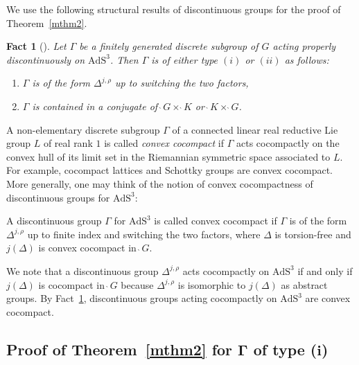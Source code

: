\documentclass[10pt,a4paper]{amsart}
\numberwithin{equation}{section}
\newtheorem{Fact}[Theorem]{Fact}
 { \theoremstyle{definition}
\newtheorem{Definition}[Theorem]{Definition}
\newtheorem{Note}[Theorem]{Note}
\newtheorem{Example}[Theorem]{Example}
\newtheorem{Remark}[Theorem]{Remark}
\newtheorem{Setting}[Theorem]{Setting}
\newtheorem{Notation}[Theorem]{Notation}
}
\begin{document}
We use the following structural results of discontinuous groups
for the proof of Theorem~\ref{mthm2}.
\begin{Fact}[{\cite[Lemma~9.2]{KaKob16}}]
\label{explicit}
Let $\Gamma$ be a finitely generated discrete subgroup of $G$
acting properly discontinuously on $\mathrm{AdS}^{3}$.
Then $\Gamma$ is of either type $(i)$ or $(ii)$ as follows:
\begin{enumerate}\itemsep=0pt
\setlength{\leftskip}{1.1cm}
\item[type\phantom{$i$}~$(i)$]
$\Gamma$ is of the form $\Delta^{j,\rho}$ up to switching the two factors,
\item[type~$(ii)$]
$\Gamma$ is contained in a conjugate of
$\grave{\ }G \times\grave{\ }K$ or
$\grave{\ }K\times\grave{\ }G$.
\end{enumerate}
\end{Fact}

A non-elementary discrete subgroup $\Gamma$ of
a connected linear real reductive Lie group $L$ of real rank $1$
is called \textit{convex cocompact}
if $\Gamma$ acts cocompactly on the convex hull of
its limit set in the Riemannian symmetric space associated to $L$.
For example, cocompact lattices and Schottky groups are convex cocompact.
More generally, one may think of the notion of convex cocompactness of
discontinuous groups for $\mathrm{AdS}^{3}$:
\begin{Definition}
\label{convex_cocompact}
A discontinuous group $\Gamma$ for $\mathrm{AdS}^{3}$ is called convex cocom\-pact
if $\Gamma$ is of the form $\Delta^{j,\rho}$
up to finite index and switching the two factors,
where $\Delta$ is torsion-free and
$j(\Delta)$ is convex cocompact in $\grave{\ }G$.
\end{Definition}

We note that
a discontinuous group $\Delta^{j,\rho}$ acts cocompactly on $\mathrm{AdS}^{3}$
if and only if
$j(\Delta)$ is cocompact in $\grave{\ }G$
because $\Delta^{j,\rho}$ is isomorphic to $j(\Delta)$ as abstract groups.
By Fact~\ref{explicit}, discontinuous groups acting cocompactly on $\mathrm{AdS}^{3}$
are convex cocompact.

\subsection[Proof of Theorem~1.4 for Gamma of type (i)]
{Proof of Theorem~\ref{mthm2} for $\boldsymbol\Gamma$ of type ($\boldsymbol i$)}
\end{document}

